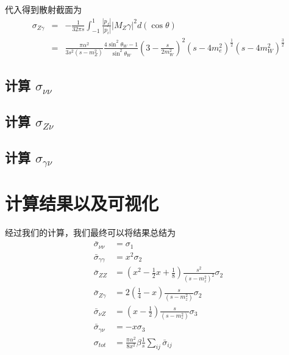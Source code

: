 \documentclass{article}
\begin{document}
代入得到散射截面为
\begin{eqnarray}
    \sigma_{Z\gamma} &=& -\frac{1}{32 \pi s} \int_{-1}^{1} \frac{|p_f|}{|p_i|} \left|M_Z\gamma\right|^2 d(\cos{\theta}) \nonumber\\
    &=& \frac{\pi \alpha^2}{3s^2(s - m_Z^2)}\frac{4\sin^2{\theta_W} - 1}{\sin^2{\theta_W}}\left(3 - \frac{s}{2m_W^2}\right)^2 \left(s - 4m_e^2 \right)^{\frac{1}{2}}\left(s - 4m_W^2\right)^{\frac{3}{2}}
\end{eqnarray}






\subsection{计算 $\sigma_{\nu \nu}$}




\subsection{计算 $\sigma_{Z\nu}$}





\subsection{计算 $\sigma_{\gamma \nu}$}






\section{计算结果以及可视化}

经过我们的计算，我们最终可以将结果总结为\cite{commins1985weak}
\begin{align*}
    \bar{\sigma}_{\nu\nu} &= \sigma_1 \\
    \bar{\sigma}_{\gamma\gamma} &= x^2 \sigma_2\\
    \bar{\sigma}_{ZZ} &= \left(x^2 - \frac{1}{2}x + \frac{1}{8}\right)\frac{s^2}{\left(s - m_z^2\right)^2}\sigma_2\\
    \bar{\sigma}_{Z\gamma} &= 2\left(\frac{1}{4} - x\right)\frac{s}{\left(s - m_z^2\right)}\sigma_2\\
    \bar{\sigma}_{\nu Z} &= \left(x - \frac{1}{2}\right)\frac{s}{\left(s - m_z^2\right)}\sigma_3\\
    \bar{\sigma}_{\gamma \nu} &= -x\sigma_3\\
    \sigma_{tot} &= \frac{\pi \alpha^2}{8 x^2} \beta \frac{1}{s} \sum_{ij}\bar{\sigma}_{ij} \\
\end{align*}
\end{document}
